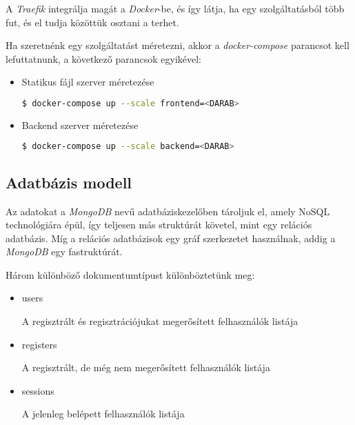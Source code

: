 A \emph{Traefik} integrálja magát a \emph{Docker}-be, és így látja, ha egy szolgáltatásból több fut, és el tudja közöttük osztani a terhet.

Ha szeretnénk egy szolgáltatást méretezni, akkor a \emph{docker-compose} parancsot kell lefuttatnunk, a következő parancsok egyikével:

\begin{itemize}
    \item Statikus fájl szerver méretezése
          \begin{lstlisting}[language=bash]
        $ docker-compose up --scale frontend=<DARAB>\end{lstlisting}
    \item Backend szerver méretezése
          \begin{lstlisting}[language=bash]
        $ docker-compose up --scale backend=<DARAB>\end{lstlisting}
\end{itemize}

\subsection{Adatbázis modell}

Az adatokat a \emph{MongoDB} nevű adatbáziskezelőben tároljuk el, amely NoSQL technológiára épül, így teljesen más struktúrát követel, mint egy relációs adatbázis. Míg a relációs adatbázisok egy gráf szerkezetet használnak, addig a \emph{MongoDB} egy fastruktúrát.

Három különböző dokumentumtípust különböztetünk meg:
\begin{itemize}
    \item users

          A regisztrált és regisztrációjukat megerősített felhasználók listája
    \item registers

          A regisztrált, de még nem megerősített felhasználók listája
    \item sessions

          A jelenleg belépett felhasználók listája
\end{itemize}

